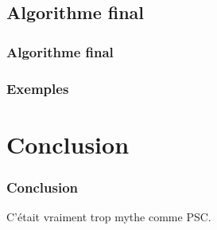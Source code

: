 \documentclass[12pt]{beamer}
\begin{document}
\begin{frame}
 \frametitle{}
 
 
\end{frame}

\subsection{Algorithme final}

\begin{frame}
 \frametitle{Algorithme final}
 
 
\end{frame}

\begin{frame}
 \frametitle{Exemples}
 
 
\end{frame}

\section{Conclusion}

\begin{frame}
 \frametitle{Conclusion}
 
C'était vraiment trop mythe comme PSC.
 
\end{frame}
\end{document}
